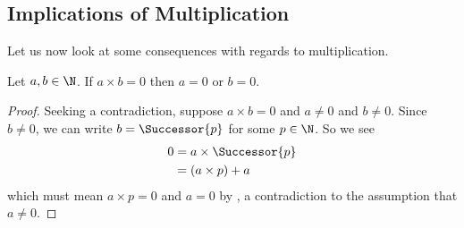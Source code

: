 \subsection{Implications of Multiplication}
Let us now look at some consequences with regards to multiplication.

\begin{proposition}\label{prop:product-that-equals-zero}
    Let $a, b \in \N$. If $a \times b = 0$ then $a = 0$ or $b = 0$.
\end{proposition}
\begin{proof}
    Seeking a contradiction, suppose $a \times b = 0$ and $a \neq 0$ and $b \neq 0$. Since $b \neq 0$, we can write $b = \Successor{p}$ for some $p \in \N$. So we see
    \begin{align*}
        0 &= a \times \Successor{p}\\
        &= (a \times p) + a
    \end{align*}
    which must mean $a \times p = 0$ and $a = 0$ by , a contradiction to the assumption that $a \neq 0$.
\end{proof}

